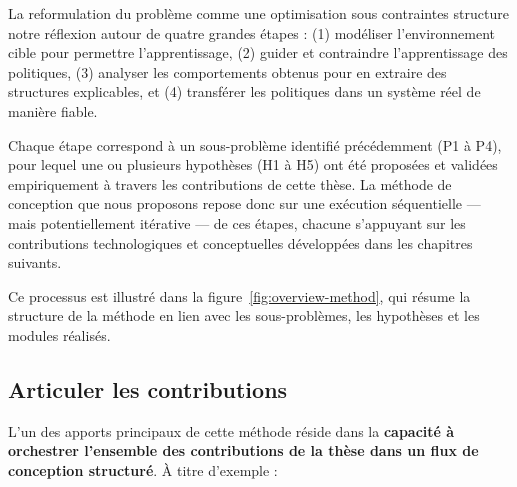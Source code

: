 \documentclass[ twoside,openright,titlepage,numbers=noenddot,headinclude,%
                footinclude=true,cleardoublepage=empty,abstractoff, %
                BCOR=5mm,paper=a4,fontsize=11pt,%
                french,american,%
                ]{scrreprt}
\begin{document}
La reformulation du problème comme une optimisation sous contraintes structure notre réflexion autour de quatre grandes étapes : (1) modéliser l'environnement cible pour permettre l'apprentissage, (2) guider et contraindre l'apprentissage des politiques, (3) analyser les comportements obtenus pour en extraire des structures explicables, et (4) transférer les politiques dans un système réel de manière fiable.

Chaque étape correspond à un sous-problème identifié précédemment (P1 à P4), pour lequel une ou plusieurs hypothèses (H1 à H5) ont été proposées et validées empiriquement à travers les contributions de cette thèse. La méthode de conception que nous proposons repose donc sur une exécution séquentielle — mais potentiellement itérative — de ces étapes, chacune s'appuyant sur les contributions technologiques et conceptuelles développées dans les chapitres suivants.

Ce processus est illustré dans la figure~\ref{fig:overview-method}, qui résume la structure de la méthode en lien avec les sous-problèmes, les hypothèses et les modules réalisés.


\subsection{Articuler les contributions}

L'un des apports principaux de cette méthode réside dans la \textbf{capacité à orchestrer l'ensemble des contributions de la thèse dans un flux de conception structuré}. À titre d'exemple :
\end{document}
